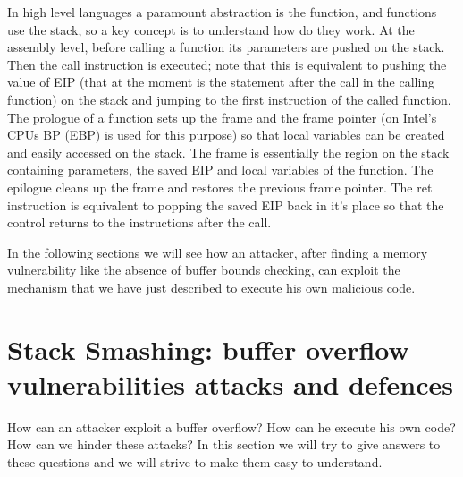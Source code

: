 \documentclass[Lau,binding=0.6cm]{sapthesis}
\begin{document}
In high level languages a paramount abstraction is the function, and functions use the stack, so a key concept is to understand how do they work. At the assembly level, before calling a function its parameters are pushed on the stack. Then the call instruction is executed; note that this is equivalent to pushing the value of EIP (that at the moment is the statement after the call in the calling function) on the stack and jumping to the first instruction of the called function. The prologue of a function sets up the frame and the frame pointer (on Intel’s CPUs BP (EBP) is used for this purpose) so that local variables can be created and easily accessed on the stack. The frame is essentially the region on the stack containing parameters, the saved EIP and local variables of the function. The epilogue cleans up the frame and restores the previous frame pointer. The ret instruction is equivalent to popping the saved EIP back in it’s place so that the control returns to the instructions after the call.

In the following sections we will see how an attacker, after finding a memory vulnerability like the absence of buffer bounds checking, can exploit the mechanism that we have just described to execute his own malicious code.


\section{Stack Smashing: buffer overflow vulnerabilities attacks and defences}

How can an attacker exploit a buffer overflow? How can he execute his own code? How can we hinder these attacks? In this section we will try to give answers to these questions and we will strive to make them easy to understand.
\end{document}
